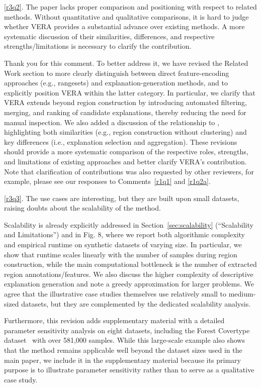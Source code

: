 \documentclass[11pt]{article}
\newcounter{rtaskno}
\newcommand{\rtask}[1]{\refstepcounter{rtaskno}\label{#1}}
\newcommand{\reviewc}[2]{\begin{leftbar}\noindent\rtask{#1}\ref{#1}. #2\end{leftbar}\vspace*{-4mm}}
\newcommand{\answer}[1]{\noindent #1\par\vspace{2mm}}
\newlength{\leftbarwidth}
\newlength{\leftbarsep}
\renewenvironment{leftbar}{%
    \def\FrameCommand{{\color{black}{\vrule width \leftbarwidth\relax\hspace {\leftbarsep}}}}%
    \MakeFramed {\advance \hsize -\width \FrameRestore }%
}{\endMakeFramed}
\begin{document}
\reviewc{r3q2}{The paper lacks proper comparison and positioning with respect to related methods. Without quantitative and qualitative comparisons, it is hard to judge whether VERA provides a substantial advance over existing methods. A more systematic discussion of their similarities, differences, and respective strengths/limitations is necessary to clarify the contribution.}

\answer{%
Thank you for this comment. To better address it, we have revised the Related Work section to more clearly distinguish between direct feature-encoding approaches (e.g., rangesets) and explanation-generation methods, and to explicitly position VERA within the latter category. In particular, we clarify that VERA extends beyond region construction by introducing automated filtering, merging, and ranking of candidate explanations, thereby reducing the need for manual inspection. We also added a discussion of the relationship to \citet{Sohns2022}, highlighting both similarities (e.g., region construction without clustering) and key differences (i.e., explanation selection and aggregation). These revisions should provide a more systematic comparison of the respective roles, strengths, and limitations of existing approaches and better clarify VERA’s contribution. Note that clarification of contributions was also requested by other reviewers, for example, please see our responses to Comments~\ref{r1q1} and \ref{r1q2a}.
}

\reviewc{r3q3}{The use cases are interesting, but they are built upon small datasets, raising doubts about the scalability of the method.}

\answer{%
Scalability is already explicitly addressed in Section~\ref{sec:scalability} (``Scalability and Limitations'') and in Fig. 8, where we report both algorithmic complexity and empirical runtime on synthetic datasets of varying size. In particular, we show that runtime scales linearly with the number of samples during region construction, while the main computational bottleneck is the number of extracted region annotations/features. We also discuss the higher complexity of descriptive explanation generation and note a greedy approximation for larger problems. We agree that the illustrative case studies themselves use relatively small to medium-sized datasets, but they are complemented by the dedicated scalability analysis.

Furthermore, this revision adds supplementary material with a detailed parameter sensitivity analysis on eight datasets, including the Forest Covertype dataset~\cite{covertype_31} with over 581,000 samples. While this large-scale example also shows that the method remains applicable well beyond the dataset sizes used in the main paper, we include it in the supplementary material because its primary purpose is to illustrate parameter sensitivity rather than to serve as a qualitative case study.
}
\end{document}
